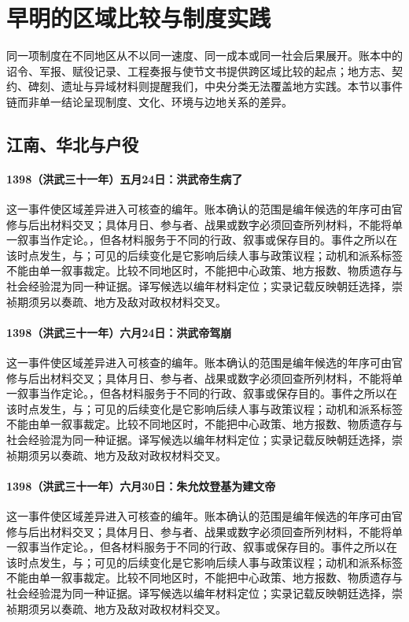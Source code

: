 \section{早明的区域比较与制度实践}

同一项制度在不同地区从不以同一速度、同一成本或同一社会后果展开。账本中的诏令、军报、赋役记录、工程奏报与使节文书提供跨区域比较的起点；地方志、契约、碑刻、遗址与异域材料则提醒我们，中央分类无法覆盖地方实践。本节以事件链而非单一结论呈现制度、文化、环境与边地关系的差异。

\subsection{江南、华北与户役}

\paragraph{1398（洪武三十一年）五月24日：洪武帝生病了} 这一事件使区域差异进入可核查的编年。账本确认的范围是编年候选的年序可由官修与后出材料交叉；具体月日、参与者、战果或数字必须回查所列材料，不能将单一叙事当作定论。，但各材料服务于不同的行政、叙事或保存目的。事件之所以在该时点发生，与；可见的后续变化是它影响后续人事与政策议程；动机和派系标签不能由单一叙事裁定。比较不同地区时，不能把中心政策、地方报数、物质遗存与社会经验混为同一种证据。译写候选以编年材料定位；实录记载反映朝廷选择，崇祯期须另以奏疏、地方及敌对政权材料交叉。

\paragraph{1398（洪武三十一年）六月24日：洪武帝驾崩} 这一事件使区域差异进入可核查的编年。账本确认的范围是编年候选的年序可由官修与后出材料交叉；具体月日、参与者、战果或数字必须回查所列材料，不能将单一叙事当作定论。，但各材料服务于不同的行政、叙事或保存目的。事件之所以在该时点发生，与；可见的后续变化是它影响后续人事与政策议程；动机和派系标签不能由单一叙事裁定。比较不同地区时，不能把中心政策、地方报数、物质遗存与社会经验混为同一种证据。译写候选以编年材料定位；实录记载反映朝廷选择，崇祯期须另以奏疏、地方及敌对政权材料交叉。

\paragraph{1398（洪武三十一年）六月30日：朱允炆登基为建文帝} 这一事件使区域差异进入可核查的编年。账本确认的范围是编年候选的年序可由官修与后出材料交叉；具体月日、参与者、战果或数字必须回查所列材料，不能将单一叙事当作定论。，但各材料服务于不同的行政、叙事或保存目的。事件之所以在该时点发生，与；可见的后续变化是它影响后续人事与政策议程；动机和派系标签不能由单一叙事裁定。比较不同地区时，不能把中心政策、地方报数、物质遗存与社会经验混为同一种证据。译写候选以编年材料定位；实录记载反映朝廷选择，崇祯期须另以奏疏、地方及敌对政权材料交叉。

